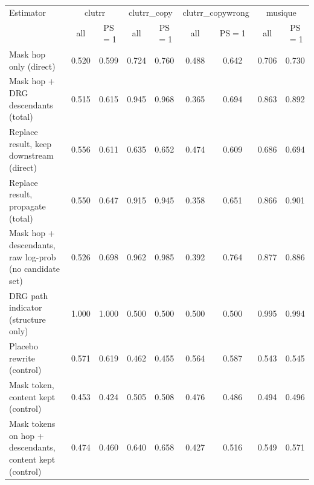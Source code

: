 \begin{tabular}{lcccccccc}
\toprule
Estimator & \multicolumn{2}{c}{clutrr} & \multicolumn{2}{c}{clutrr\_copy} & \multicolumn{2}{c}{clutrr\_copywrong} & \multicolumn{2}{c}{musique} \\
 & all & PS$=$1 & all & PS$=$1 & all & PS$=$1 & all & PS$=$1 \\
\midrule
Mask hop only (direct) & 0.520 & 0.599 & 0.724 & 0.760 & 0.488 & 0.642 & 0.706 & 0.730 \\
Mask hop + DRG descendants (total) & 0.515 & 0.615 & 0.945 & 0.968 & 0.365 & 0.694 & 0.863 & 0.892 \\
Replace result, keep downstream (direct) & 0.556 & 0.611 & 0.635 & 0.652 & 0.474 & 0.609 & 0.686 & 0.694 \\
Replace result, propagate (total) & 0.550 & 0.647 & 0.915 & 0.945 & 0.358 & 0.651 & 0.866 & 0.901 \\
Mask hop + descendants, raw log-prob (no candidate set) & 0.526 & 0.698 & 0.962 & 0.985 & 0.392 & 0.764 & 0.877 & 0.886 \\
DRG path indicator (structure only) & 1.000 & 1.000 & 0.500 & 0.500 & 0.500 & 0.500 & 0.995 & 0.994 \\
Placebo rewrite (control) & 0.571 & 0.619 & 0.462 & 0.455 & 0.564 & 0.587 & 0.543 & 0.545 \\
Mask token, content kept (control) & 0.453 & 0.424 & 0.505 & 0.508 & 0.476 & 0.486 & 0.494 & 0.496 \\
Mask tokens on hop + descendants, content kept (control) & 0.474 & 0.460 & 0.640 & 0.658 & 0.427 & 0.516 & 0.549 & 0.571 \\
\bottomrule
\end{tabular}
